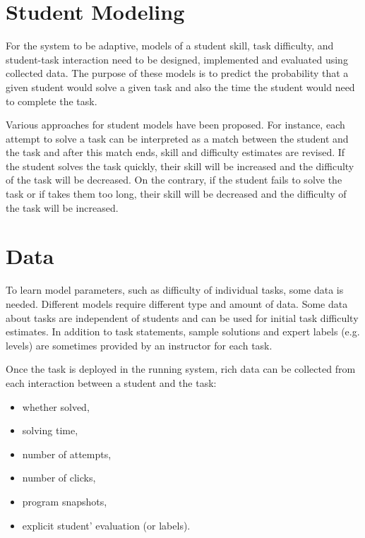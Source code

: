 \section{Student Modeling}
\label{sec:student-modeling}

For the system to be adaptive, models of
  a student skill, task difficulty, and student-task interaction
  need to be designed, implemented and evaluated using collected data.
The purpose of these models is to predict the probability that a given student
  would solve a given task
  and also the time the student would need to complete the task.

Various approaches for student models have been proposed.
For instance, each attempt to solve a task can be interpreted
  as a match between the student and the task and after this match ends,
  skill and difficulty estimates are revised.
If the student solves the task quickly, their skill will be increased
  and the difficulty of the task will be decreased.
On the contrary, if the student fails to solve the task or if takes them too long,
  their skill will be decreased and the difficulty of the task will be increased.


\section{Data}
\label{sec:student-modeling.data}

To learn model parameters, such as difficulty of individual tasks, some data is needed.
Different models require different type and amount of data.
Some data about tasks are independent of students and can be used
  for initial task difficulty estimates.
In addition to task statements, sample solutions and expert labels (e.g. levels)
  are sometimes provided by an instructor for each task.

Once the task is deployed in the running system,
  rich data can be collected from each interaction between a student and the task:
\begin{itemize}
  \item whether solved,
  \item solving time,
  \item number of attempts,
  \item number of clicks,
  \item program snapshots,
  \item explicit student' evaluation (or labels). %
\end{itemize}

